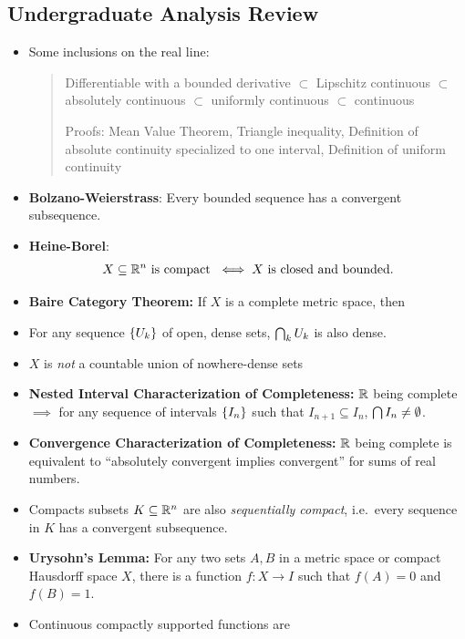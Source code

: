 \hypertarget{undergraduate-analysis-review}{%
\subsection{Undergraduate Analysis
Review}\label{undergraduate-analysis-review}}

\begin{itemize}
\item
  Some inclusions on the real line:

  \begin{quote}
  Differentiable with a bounded derivative \(\subset\) Lipschitz
  continuous \(\subset\) absolutely continuous \(\subset\) uniformly
  continuous \(\subset\) continuous

  Proofs: Mean Value Theorem, Triangle inequality, Definition of
  absolute continuity specialized to one interval, Definition of uniform
  continuity
  \end{quote}
\item
  \textbf{Bolzano-Weierstrass}: Every bounded sequence has a convergent
  subsequence.
\item
  \textbf{Heine-Borel}:
  \begin{align*}
  X \subseteq {\mathbb{R}}^n \text{ is compact }
  \iff
  X \text{ is closed and bounded}
  .\end{align*}
\item
  \textbf{Baire Category Theorem:} If \(X\) is a complete metric space,
  then
\item
  For any sequence \(\left\{{U_k}\right\}\) of open, dense sets,
  \(\bigcap_k U_k\) is also dense.
\item
  \(X\) is \emph{not} a countable union of nowhere-dense sets
\item
  \textbf{Nested Interval Characterization of Completeness:} \({\mathbb{R}}\)
  being complete \(\implies\) for any sequence of intervals
  \(\left\{{I_n}\right\}\) such that \(I_{n+1} \subseteq I_n\),
  \(\bigcap I_n \neq \emptyset\).
\item
  \textbf{Convergence Characterization of Completeness:} \({\mathbb{R}}\) being
  complete is equivalent to ``absolutely convergent implies convergent''
  for sums of real numbers.
\item
  Compacts subsets \(K \subseteq {\mathbb{R}}^n\) are also \emph{sequentially
  compact}, i.e.~every sequence in \(K\) has a convergent subsequence.
\item
  \textbf{Urysohn's Lemma:} For any two sets \(A, B\) in a metric space
  or compact Hausdorff space \(X\), there is a function \(f:X \to I\)
  such that \(f(A) = 0\) and \(f(B) = 1\).
\item
  Continuous compactly supported functions are


\end{itemize}
